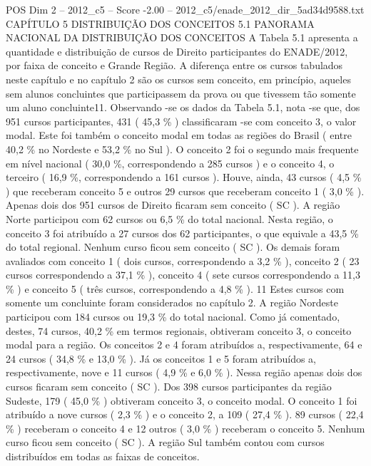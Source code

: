 \begin{textsample}{POS Dim 2 – 2012\_c5 – Score -2.00 – 2012\_c5/enade\_2012\_dir\_5ad34d9588.txt}  \label{ex:f2_pos_360}
CAPÍTULO 5 DISTRIBUIÇÃO DOS CONCEITOS 5.1 PANORAMA NACIONAL DA DISTRIBUIÇÃO DOS CONCEITOS A Tabela 5.1 apresenta a quantidade e distribuição de cursos de Direito participantes do ENADE/2012, por faixa de conceito e Grande Região.
A diferença entre os cursos tabulados neste capítulo e no capítulo 2 são os cursos sem conceito, em princípio, aqueles sem alunos concluintes que participassem da prova ou que tivessem tão somente um aluno concluinte11.
Observando -se os dados da Tabela 5.1, nota -se que, dos 951 cursos participantes, 431 ( 45,3 \% ) classificaram -se com conceito 3, o valor modal.
Este foi também o conceito modal em todas as regiões do Brasil ( entre 40,2 \% no Nordeste e 53,2 \% no Sul ).
O conceito 2 foi o segundo mais frequente em nível nacional ( 30,0 \%, correspondendo a 285 cursos ) e o conceito 4, o terceiro ( 16,9 \%, correspondendo a 161 cursos ).
Houve, ainda, 43 cursos ( 4,5 \% ) que receberam conceito 5 e outros 29 cursos que receberam conceito 1 ( 3,0 \% ).
Apenas dois dos 951 cursos de Direito ficaram sem conceito ( SC ).
A região Norte participou com 62 cursos ou 6,5 \% do total nacional.
Nesta região, o conceito 3 foi atribuído a 27 cursos dos 62 participantes, o que equivale a 43,5 \% do total regional.
Nenhum curso ficou sem conceito ( SC ).
Os demais foram avaliados com conceito 1 ( dois cursos, correspondendo a 3,2 \% ), conceito 2 ( 23 cursos correspondendo a 37,1 \% ), conceito 4 ( sete cursos correspondendo a 11,3 \% ) e conceito 5 ( três cursos, correspondendo a 4,8 \% ). 11 Estes cursos com somente um concluinte foram considerados no capítulo 2.
A região Nordeste participou com 184 cursos ou 19,3 \% do total nacional.
Como já comentado, destes, 74 cursos, 40,2 \% em termos regionais, obtiveram conceito 3, o conceito modal para a região.
Os conceitos 2 e 4 foram atribuídos a, respectivamente, 64 e 24 cursos ( 34,8 \% e 13,0 \% ).
Já os conceitos 1 e 5 foram atribuídos a, respectivamente, nove e 11 cursos ( 4,9 \% e 6,0 \% ).
Nessa região apenas dois dos cursos ficaram sem conceito ( SC ).
Dos 398 cursos participantes da região Sudeste, 179 ( 45,0 \% ) obtiveram conceito 3, o conceito modal.
O conceito 1 foi atribuído a nove cursos ( 2,3 \% ) e o conceito 2, a 109 ( 27,4 \% ). 89 cursos ( 22,4 \% ) receberam o conceito 4 e 12 outros ( 3,0 \% ) receberam o conceito 5.
Nenhum curso ficou sem conceito ( SC ).
A região Sul também contou com cursos distribuídos em todas as faixas de conceitos.

\end{textsample}
